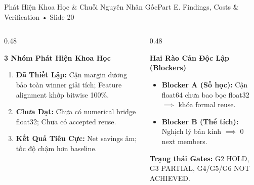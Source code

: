 \documentclass[aspectratio=169, 10pt]{beamer}
\begin{document}
\begin{frame}{Phát Hiện Khoa Học \& Chuỗi Nguyên Nhân Gốc}{Part E. Findings, Costs \& Verification • Slide 20}
    \begin{columns}
        \begin{column}{0.48\textwidth}
            \begin{block}{\textbf{3 Nhóm Phát Hiện Khoa Học}}
                \footnotesize
                \begin{enumerate}
                    \item \textbf{Đã Thiết Lập:} Cận margin dương bảo toàn winner giải tích; Feature alignment khớp bitwise 100\%.
                    \item \textbf{Chưa Đạt:} Chưa có numerical bridge float32; Chưa có accepted reuse.
                    \item \textbf{Kết Quả Tiêu Cực:} Net savings âm; tốc độ chậm hơn baseline.
                \end{enumerate}
            \end{block}
        \end{column}
        \begin{column}{0.48\textwidth}
            \begin{alertblock}{\textbf{Hai Rào Cản Độc Lập (Blockers)}}
                \footnotesize
                \begin{itemize}
                    \item \textbf{Blocker A (Số học):} Cận float64 chưa bao bọc float32 $\implies$ khóa formal reuse.
                    \item \textbf{Blocker B (Thể tích):} Nghịch lý bán kính $\implies$ 0 next members.
                \end{itemize}
            \end{alertblock}
            \vspace{0.1cm}
            \textbf{Trạng thái Gates:} G2 HOLD, G3 PARTIAL, G4/G5/G6 NOT ACHIEVED.
        \end{column}
    \end{columns}
\end{frame}
\end{document}
